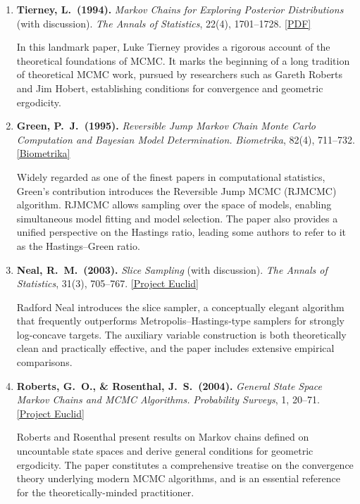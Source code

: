 \documentclass[12pt, a4paper]{article}
\begin{document}
\begin{enumerate}
\item \textbf{Tierney, L.\ (1994).}
\textit{Markov Chains for Exploring Posterior Distributions} (with discussion).
\textit{The Annals of Statistics}, 22(4), 1701--1728.
\href{http://www.stat.rutgers.edu/~rongchen/papers/tierney.pdf}{[PDF]}

In this landmark paper, Luke Tierney provides a rigorous account of the theoretical foundations of MCMC.
It marks the beginning of a long tradition of theoretical MCMC work, pursued by researchers such as Gareth Roberts and Jim Hobert, establishing conditions for convergence and geometric ergodicity.

\item \textbf{Green, P.~J.\ (1995).}
\textit{Reversible Jump Markov Chain Monte Carlo Computation and Bayesian Model Determination.}
\textit{Biometrika}, 82(4), 711--732.
\href{https://doi.org/10.1093/biomet/82.4.711}{[Biometrika]}

Widely regarded as one of the finest papers in computational statistics, Green's contribution introduces the Reversible Jump MCMC (RJMCMC) algorithm.
RJMCMC allows sampling over the space of models, enabling simultaneous model fitting and model selection.
The paper also provides a unified perspective on the Hastings ratio, leading some authors to refer to it as the Hastings--Green ratio.

\item \textbf{Neal, R.~M.\ (2003).}
\textit{Slice Sampling} (with discussion).
\textit{The Annals of Statistics}, 31(3), 705--767.
\href{https://projecteuclid.org/euclid.aos/1056562461}{[Project Euclid]}

Radford Neal introduces the slice sampler, a conceptually elegant algorithm that frequently outperforms Metropolis--Hastings-type samplers for strongly log-concave targets.
The auxiliary variable construction is both theoretically clean and practically effective, and the paper includes extensive empirical comparisons.

\item \textbf{Roberts, G.~O., \& Rosenthal, J.~S.\ (2004).}
\textit{General State Space Markov Chains and MCMC Algorithms.}
\textit{Probability Surveys}, 1, 20--71.
\href{https://projecteuclid.org/euclid.ps/1099928648}{[Project Euclid]}

Roberts and Rosenthal present results on Markov chains defined on uncountable state spaces and derive general conditions for geometric ergodicity.
The paper constitutes a comprehensive treatise on the convergence theory underlying modern MCMC algorithms, and is an essential reference for the theoretically-minded practitioner.


\end{enumerate}
\end{document}
